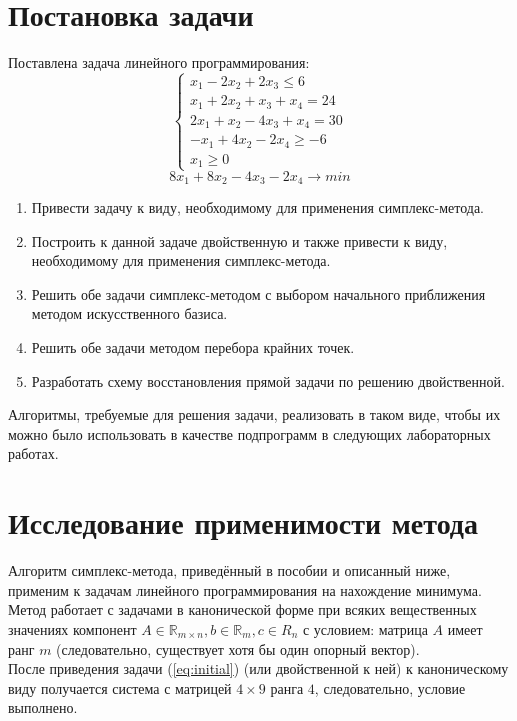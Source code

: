 \documentclass[main.tex]{subfiles}
\begin{document}
	
	\section{Постановка задачи}
	Поставлена задача линейного программирования:
	\begin{equation}\label{eq:initial}
	\left\{
	\begin{array}{ll} 
	x_1-2x_2+2x_3 \le 6\\
	x_1+2x_2+x_3+x_4=24\\
	2x_1+x_2-4x_3+x_4=30\\
	-x_1+4x_2-2x_4 \ge -6\\
	x_1 \ge 0
	\end{array}
	\right.
	\end{equation}
	$$ 8x_1 + 8x_2 - 4x_3 - 2x_4 \longrightarrow min $$
	\begin{enumerate}
		\item Привести задачу к виду, необходимому для применения симплекс-метода.
		\item Построить к данной задаче двойственную и также привести к виду, необходимому для применения симплекс-метода.
		\item Решить обе задачи симплекс-методом с выбором начального приближения методом искусственного базиса.
		\item Решить обе задачи методом перебора крайних точек.
		\item Разработать схему восстановления прямой задачи по решению двойственной.
	\end{enumerate}
	Алгоритмы, требуемые для решения задачи, реализовать в таком виде, чтобы их можно было использовать в качестве подпрограмм в следующих лабораторных работах.
	\section{Исследование применимости метода}
	Алгоритм симплекс-метода, приведённый в пособии \cite{petuh} и описанный ниже, применим к задачам линейного программирования на нахождение минимума. Метод работает с задачами в канонической форме при всяких вещественных значениях компонент $A \in \mathds{R}_{m\times n}, b \in \mathds{R}_m, c \in R_n$ с условием: матрица $A$ имеет ранг $m$ (следовательно, существует хотя бы один опорный вектор).\\
	После приведения задачи (\ref{eq:initial}) (или двойственной к ней) к каноническому виду получается система с матрицей $ 4 \times 9 $ ранга $4$, следовательно, условие выполнено.\\
	
\end{document}
